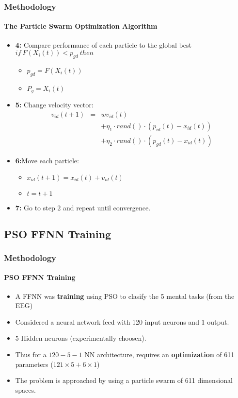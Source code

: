 \frame
{
\frametitle{Methodology}
\framesubtitle{The Particle Swarm Optimization Algorithm}
	\begin{itemize}
		\item \textbf{4:} Compare performance of each particle to the global best $if\ F(X_{i}(t)) < p_{gd}\ then$
		\begin{itemize}
			\item $p_{gd} = F(X_{i}(t))$
			\item $P_{g} = X_{i}(t)$
		\end{itemize}
		\item \textbf{5:} Change velocity vector:
			\begin{eqnarray*}
			v_{id}(t+1) &=& wv_{id}(t)\\
					    & & +\eta_{1} \cdot rand() \cdot  (p_{id}(t) - x_{id}(t))\\
						& & +\eta_{2} \cdot rand() \cdot (p_{gd}(t) - x_{id}(t))
			\end{eqnarray*}
		\item \textbf{6:}Move each particle:
		\begin{itemize}
			\item $x_{id}(t+1) = x_{id}(t) + v_{id}(t)$
			\item $t = t + 1$
		\end{itemize}
		\item \textbf{7:} Go to step 2 and repeat until convergence.
	\end{itemize}
}

\subsection{PSO FFNN Training}
\frame
{
\frametitle{Methodology}
\framesubtitle{PSO FFNN Training}
\begin{itemize}
	\item A FFNN was \textbf{training} using PSO to clasify the 5 mental tasks (from the EEG)
	\item Considered a neural network feed with 120 input neurons and 1 output.
	\item 5 Hidden neurons (experimentally choosen).
	\item Thus for a $120-5-1$ NN architecture, requires an \textbf{optimization} of 611 parameters ($121\times 5 + 6\times 1$)
	\item The problem is approached by using a particle swarm of 611 dimensional spaces.
\end{itemize}
}

